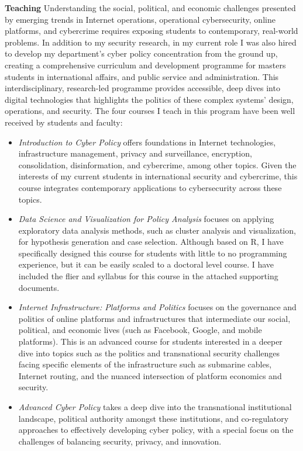 \documentclass[11pt]{letter}
\begin{document}
\begin{letter}
\textbf{Teaching} \vspace{0.2 \baselineskip} \newline %
%
Understanding the social, political, and economic challenges presented by emerging trends in Internet operations, operational cybersecurity, online platforms, and cybercrime requires exposing students to contemporary, real-world problems.
%
In addition to my security research, in my current role I was also hired to develop my department's cyber policy concentration from the ground up, creating a comprehensive curriculum and development programme for masters students in international affairs, and public service and administration.
%
This interdisciplinary, research-led programme provides accessible, deep dives into digital technologies that highlights the politics of these complex systems' design, operations, and security.
%
The four courses I teach in this program have been well received by students and faculty:
%
\begin{itemize}
  \item \emph{Introduction to Cyber Policy} offers foundations in Internet technologies, infrastructure management, privacy and surveillance, encryption, consolidation, disinformation, and cybercrime, among other topics.  Given the interests of my current students in international security and cybercrime, this course integrates contemporary applications to cybersecurity across these topics.
  \item \emph{Data Science and Visualization for Policy Analysis} focuses on applying exploratory data analysis methods, such as cluster analysis and visualization, for hypothesis generation and case selection.  Although based on R, I have specifically designed this course for students with little to no programming experience, but it can be easily scaled to a doctoral level course.  I have included the flier and syllabus for this course in the attached supporting documents.
  \item \emph{Internet Infrastructure: Platforms and Politics} focuses on the governance and politics of online platforms and infrastructures that intermediate our social, political, and economic lives (such as Facebook, Google, and mobile platforms).  This is an advanced course for students interested in a deeper dive into topics such as the politics and transnational security challenges facing specific elements of the infrastructure such as submarine cables, Internet routing, and the nuanced intersection of platform economics and security.
  \item \emph{Advanced Cyber Policy} takes a deep dive into the transnational institutional landscape, political authority amongst these institutions, and co-regulatory approaches to effectively developing cyber policy, with a special focus on the challenges of balancing security, privacy, and innovation.
\end{itemize}
%



\end{letter}
\end{document}
